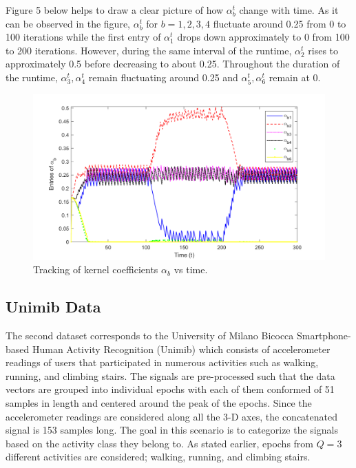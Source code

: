 \documentclass[10pt,final]{IEEEtran}
\begin{document}
Figure 5 below helps to draw a clear picture of how $\alpha_b^t$ change with time. As it can be observed in the figure, $\alpha_b^t$ for $b=1,2,3,4$ fluctuate around 0.25 from 0 to 100 iterations while the first entry of $\alpha_1^t$  drops down approximately to 0 from 100 to 200 iterations. However, during the same interval of the runtime, $\alpha_2^t$  rises to approximately 0.5 before decreasing to about 0.25. Throughout the duration of the runtime, $\alpha_3^t,\alpha_4^t$  remain fluctuating around 0.25 and $\alpha_5^t,\alpha_6^t$ remain at 0. 
\begin{figure}[htp]
    \centering
    \includegraphics[scale=0.2]{tracking_entries_of_alpha_b.png}
    \caption{Tracking of kernel coefficients $\alpha_b$ vs time.}
    \label{Fig:2}
\end{figure}
\subsection{Unimib Data}
The second dataset corresponds to the University of Milano Bicocca Smartphone-based Human Activity Recognition (Unimib) which consists of accelerometer readings of users that participated in numerous activities such as walking, running, and climbing stairs. The signals are pre-processed such that the data vectors are grouped into individual epochs with each of them conformed of 51 samples in length and centered around the peak of the epochs. Since the accelerometer readings are considered along all the 3-D axes, the concatenated signal is 153 samples long. The goal in this scenario is to categorize the signals based on the activity class they belong to. As stated earlier, epochs from $Q=3$ different activities are considered; walking, running, and climbing stairs.
\end{document}
